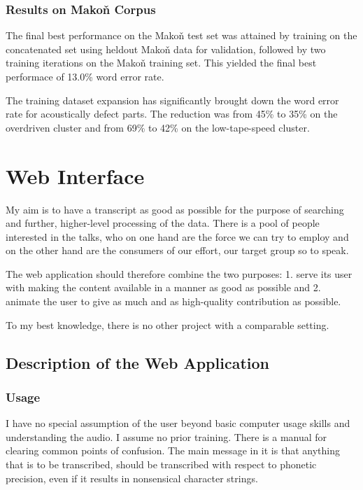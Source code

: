 \documentclass[12pt,a4paper]{report}
\begin{document}
\subsection{Results on Makoň Corpus}

The final best performance on the Makoň test set was attained by training on the
concatenated set using heldout Makoň data for validation, followed by two
training iterations on the Makoň training set. This yielded the final best performace of 13.0\% word error rate.

The training dataset expansion has significantly brought down the word error
rate for acoustically defect parts. The reduction was from 45\% to 35\% on the
overdriven cluster and from 69\% to 42\% on the low-tape-speed cluster.

\chapter{Web Interface}

My aim is to have a transcript as good as possible for the purpose
of searching and further, higher-level processing of the data. There is a pool
of people interested in the talks, who on one hand are the force we can try to
employ and on the other hand are the consumers of our effort, our target group
so to speak.

The web application should therefore combine the two purposes: 1. serve its user
with making the content available in a manner as good as possible and 2. animate
the user to give as much and as high-quality contribution as possible.

To my best knowledge, there is no other project with a comparable setting.

\section{Description of the Web Application}

\subsection{Usage}

I have no special assumption of the user beyond basic computer usage skills and
understanding the audio. I assume no prior training. There is a manual for
clearing common points of confusion. The main message in it is that anything
that is to be transcribed, should be transcribed with respect to
phonetic precision, even if it results in nonsensical character strings.
\end{document}

